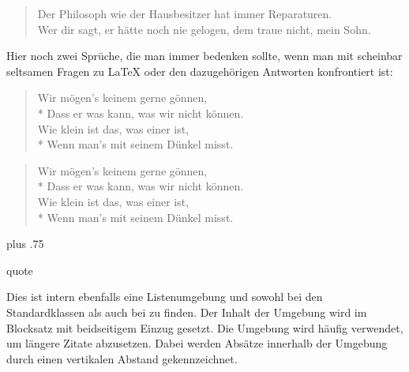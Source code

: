 \begin{Example}
\begin{lstcode}
  \begin{verse}
    Der Philosoph wie der Hausbesitzer
    hat immer Reparaturen.\\
    \bigskip
    Wer dir sagt, er hätte noch nie
    gelogen, dem traue nicht, mein Sohn.
  \end{verse}
\end{lstcode}
      \iftrue%
        Hier noch zwei Sprüche, die man immer bedenken sollte, wenn man mit
        scheinbar seltsamen Fragen zu {\LaTeX} oder den dazugehörigen Antworten
        konfrontiert ist:
\begin{lstcode}
  \begin{verse}
    Wir mögen's keinem gerne gönnen,\\*
    Dass er was kann, was wir nicht können.\\
    \bigskip
    Wie klein ist das, was einer ist,\\*
    Wenn man's mit seinem Dünkel misst.
  \end{verse}
\end{lstcode}
        \begin{ShowOutput}
          \begin{verse}
            Wir mögen's keinem gerne gönnen,\\*
            Dass er was kann, was wir nicht können.\\
            \bigskip
            Wie klein ist das, was einer ist,\\*
            Wenn man's mit seinem Dünkel misst.
          \end{verse}
        \end{ShowOutput}
      \fi %
      \iffalse %
        In diesen Beispielen wurde übrigens jeweils \Macro{bigskip} verwendet,
        um zwei Sprüche voneinander zu trennen.%
      \fi %
    \end{Example}%
    \ht\strutbox plus .75\strutbox%
  \fi
  \EndIndexGroup


  \iffalse%
    \begin{Declaration}
      \begin{Environment}{quote}\end{Environment}
    \end{Declaration}%
    Dies ist
    intern ebenfalls eine Listenumgebung und sowohl bei den Standardklassen als auch bei
    {\KOMAScript} zu finden. Der Inhalt der Umgebung wird im Blocksatz mit
    beidseitigem Einzug gesetzt. Die Umgebung wird häufig verwendet, um
    längere Zitate abzusetzen. Dabei werden Absätze innerhalb der
    Umgebung durch einen vertikalen Abstand gekennzeichnet.%
    \EndIndexGroup

